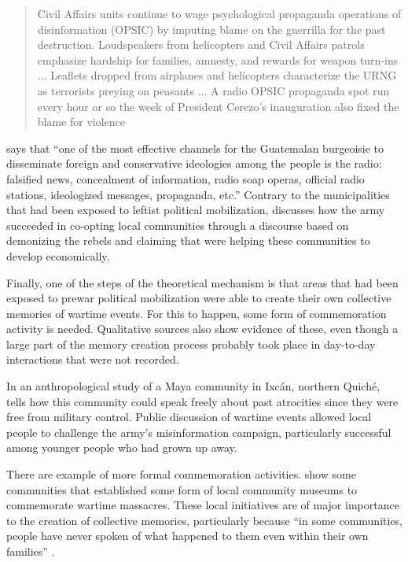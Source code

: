 \documentclass[12pt, notitlepage]{article}
\begin{document}
\begin{quote}
  Civil Affairs units continue to wage psychological propaganda operations of disinformation (OPSIC) by imputing blame on the guerrilla for the past destruction. Loudspeakers from helicopters and Civil Affairs patrols emphasize hardship for families, amnesty, and rewards for weapon turn-ins ... Leaflets dropped from airplanes and helicopters characterize the URNG as terrorists preying on peasants ... A radio OPSIC propaganda spot run every hour or so the week of President Cerezo's inauguration also fixed the blame for violence \citep[111]{Schirmer:1998wa}
\end{quote}

\citet[16]{Bran:1985tc} says that ``one of the most effective channels for the Guatemalan burgeoisie to disseminate foreign and conservative ideologies among the people is the radio: falsified news, concealment of information, radio soap operas, official radio stations, ideologized messages, propaganda, etc.''
Contrary to the municipalities that had been exposed to leftist political mobilization, \citet{Esparza:2018uw} discusses how the army succeeded in co-opting local communities through a discourse based on demonizing the rebels and claiming that were helping these communities to develop economically.


Finally, one of the steps of the theoretical mechanism is that areas that had been exposed to prewar political mobilization were able to create their own collective memories of wartime events.
For this to happen, some form of commemoration activity is needed.
Qualitative sources also show evidence of these, even though a large part of the memory creation process probably took place in day-to-day interactions that were not recorded.

In an anthropological study of a Maya community in Ixcán, northern Quiché, \citet{Falla:2006vu} tells how this community could speak freely about past atrocities since they were free from military control.
Public discussion of wartime events allowed local people to challenge the army's misinformation campaign, particularly successful among younger people who had grown up away.

There are example of more formal commemoration activities. \citet{Arriaza:2008wf} show some communities that established some form of local community museums to commemorate wartime massacres.
These local initiatives are of major importance to the creation of collective memories, particularly because ``in some communities, people have never spoken of what happened to them even within their own families'' \citep[161]{Arriaza:2008wf}.
\end{document}
